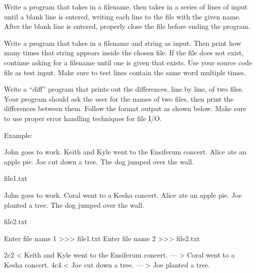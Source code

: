 \documentclass[11pt]{cselabheader}
\begin{document}
\begin{ex}[save.py] Write a program that takes in a filename, then takes in
  a series of lines of input until a blank line is entered, writing each line to
  the file with the given name. After the blank line is entered, properly close
  the file before ending the program.
\end{ex}

\begin{ex} Write a program that
  takes in a filename and string as input. Then print how many times that string
  appears inside the chosen file. If the file does not exist, continue asking
  for a filename until one is given that exists. Use your source code file as
  test input. Make sure to test lines contain the same word multiple times.
\end{ex}

\begin{ex}[diff.py]
  Write a ``diff'' program that prints out the differences, line by line, of
  two files.  Your program should ask the user for the names of two files,
  then print the differences between them.  Follow the format output as shown
  below. Make sure to use proper error handling techniques for file I/O.

  Example:

  \begin{listing}[H]
    \vspace{-0.5em}
    \begin{verbatimcode}
John goes to work.
Keith and Kyle went to the Ensiferum concert.
Alice ate an apple pie.
Joe cut down a tree.
The dog jumped over the wall.
    \end{verbatimcode}
    \vspace{-0.5em}
    \caption{file1.txt}
    \vspace{-0.5em}
  \end{listing}

  \begin{listing}[H]
    \vspace{-0.5em}
    \begin{verbatimcode}
John goes to work.
Coral went to a Kesha concert.
Alice ate an apple pie.
Joe planted a tree.
The dog jumped over the wall.
    \end{verbatimcode}
    \vspace{-0.5em}
    \caption{file2.txt}
    \vspace{-0.5em}
  \end{listing}

  \begin{verbatimcode}
Enter file name 1 >>> file1.txt
Enter file name 2 >>> file2.txt

2c2
< Keith and Kyle went to the Ensiferum concert.
---
> Coral went to a Kesha concert.
4c4
< Joe cut down a tree.
---
> Joe planted a tree.
  \end{verbatimcode}
\end{ex}
\end{document}
